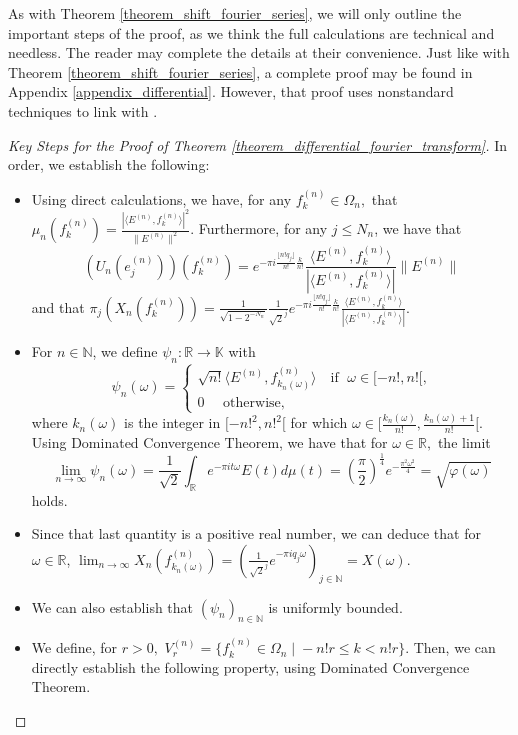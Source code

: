 \documentclass{amsart}
\theoremstyle{definition}
\theoremstyle{remark}
\def \LL{\langle}
\def \RR{\rangle}
\begin{document}
As with Theorem \ref{theorem_shift_fourier_series}, we will only outline the important steps of the proof, as we think the full calculations are technical and needless. The reader may complete the details at their convenience. Just like with Theorem \ref{theorem_shift_fourier_series}, a complete proof may be found in  Appendix \ref{appendix_differential}. However, that proof uses nonstandard techniques to link with \cite{nonez2024spectralequivalencesnonstandardsamplings}.

\begin{proof}[Key Steps for the Proof of Theorem \ref{theorem_differential_fourier_transform}]
	In order, we establish the following:
	\begin{itemize}
		\item Using direct calculations, we have, for any $f_k^{(n)}\in\Omega_n,$  that $\mu_n(f_k^{(n)})=\frac{|\LL E^{(n)}, f_k^{(n)}\RR|^2}{\|E^{(n)}\|^2}.$ Furthermore, for any $j\leq N_n$, we have that $$(U_n(e_j^{(n)}))(f_k^{(n)})=e^{-\pi i \frac{\lfloor n!q_j\rfloor}{n!}\frac{k}{n!}}\frac{\LL E^{(n)}, f_k^{(n)}\RR}{|\LL E^{(n)}, f_k^{(n)}\RR|}\|E^{(n)}\|$$ and that $\pi_j (X_n(f_k^{(n)}))=\frac{1}{\sqrt{1-2^{-N_n}}}\frac{1}{\sqrt{2}^j}e^{-\pi i \frac{\lfloor n!q_j\rfloor}{n!}\frac{k}{n!}}\frac{\LL E^{(n)}, f_k^{(n)}\RR}{|\LL E^{(n)}, f_k^{(n)}\RR|}.$
		\item For $n\in\mathbb{N}$, we define $\psi_n:\mathbb{R}\rightarrow\mathbb{K}$ with $$\psi_n(\omega)=\begin{cases}
			\sqrt{n!}\LL E^{(n)},f_{k_n(\omega)}^{(n)}\RR \quad \text{if $\;\omega\in[-n!,n![$,}\\
			0 \quad \text{ otherwise, }
		\end{cases}$$ where $k_n(\omega)$ is the integer in $[-n!^2,n!^2[$ for which $\omega\in[\frac{k_n(\omega)}{n!},\frac{k_n(\omega)+1}{n!}[.$ Using Dominated Convergence Theorem, we have that for $\omega\in\mathbb{R},$ the limit $$\lim_{n\rightarrow\infty}\psi_n(\omega)=\frac{1}{\sqrt{2}}\int_{\mathbb{R}}e^{-\pi i t\omega}E(t)d\mu(t)=\left(\frac{\pi}{2}\right)^{\frac{1}{4}}e^{-\frac{\pi^2\omega^2}{4}}=\sqrt{\varphi(\omega)}$$ holds. 
		\item Since that last quantity is a positive real number, we can deduce that for $\omega\in\mathbb{R}$, $\lim_{n\rightarrow\infty} X_n(f_{k_n(\omega)}^{(n)})=\left(\frac{1}{\sqrt{2}^j}e^{-\pi i q_j \omega}\right)_{j\in\mathbb{N}}=X(\omega).$ 
		\item We can also establish that $(\psi_n)_{n\in\mathbb{N}}$ is uniformly bounded.
		\item We define, for $r>0,$ $V_r^{(n)}=\{f_k^{(n)}\in \Omega_n\;|\; -n!r\leq k <n!r\}.$  Then, we can directly establish the following property, using Dominated Convergence Theorem.

\end{itemize}
\end{proof}
\end{document}
